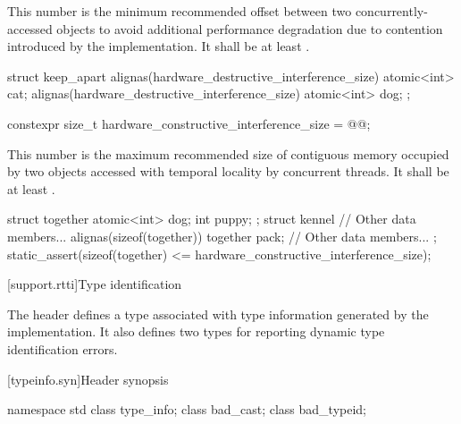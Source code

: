 \pnum
This number is the minimum recommended offset
between two concurrently-accessed objects
to avoid additional performance degradation due to contention
introduced by the implementation.
It shall be at least .

%
\begin{example}
\begin{codeblock}
struct keep_apart {
  alignas(hardware_destructive_interference_size) atomic<int> cat;
  alignas(hardware_destructive_interference_size) atomic<int> dog;
};
\end{codeblock}
\end{example}

%
\begin{codeblock}
constexpr size_t hardware_constructive_interference_size = @\impdef{}@;
\end{codeblock}

\pnum
This number is the maximum recommended size of contiguous memory
occupied by two objects accessed with temporal locality by concurrent threads.
It shall be at least .

%
\begin{example}
\begin{codeblock}
struct together {
  atomic<int> dog;
  int puppy;
};
struct kennel {
  // Other data members...
  alignas(sizeof(together)) together pack;
  // Other data members...
};
static_assert(sizeof(together) <= hardware_constructive_interference_size);
\end{codeblock}
\end{example}

[support.rtti]{Type identification}

\pnum
The header
defines a
type associated with type information generated by the implementation.
It also defines two types for reporting dynamic type identification errors.

[typeinfo.syn]{Header  synopsis}
%
%
%
%
%

\begin{codeblock}
namespace std {
  class type_info;
  class bad_cast;
  class bad_typeid;
}
\end{codeblock}

